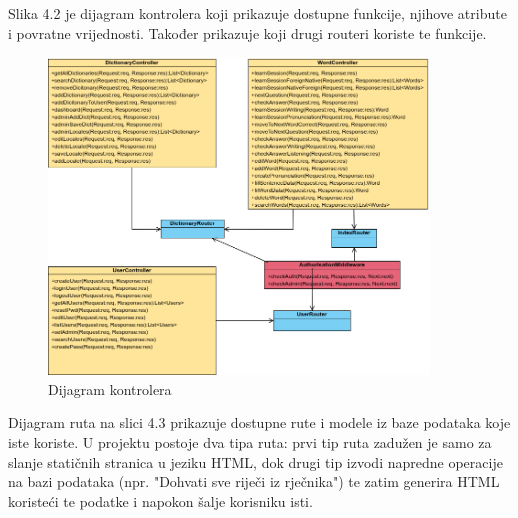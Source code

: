             Slika 4.2 je dijagram kontrolera koji prikazuje dostupne funkcije, njihove atribute i povratne vrijednosti. Također prikazuje koji drugi routeri koriste te funkcije.
				\begin{figure}[H]
					\includegraphics[width=0.9\textwidth]{dijagrami/slika1.png} 
					\centering
					\caption{Dijagram kontrolera}
					\label{fig:class_diagram}
				\end{figure}			
			\eject
            Dijagram ruta na slici 4.3 prikazuje dostupne rute i modele iz baze podataka koje iste koriste. U projektu postoje dva tipa ruta: prvi tip ruta zadužen je samo za slanje statičnih stranica u jeziku HTML, dok drugi tip izvodi napredne operacije na bazi podataka (npr. "Dohvati sve riječi iz rječnika") te zatim generira HTML koristeći te podatke i napokon šalje korisniku isti.
           

